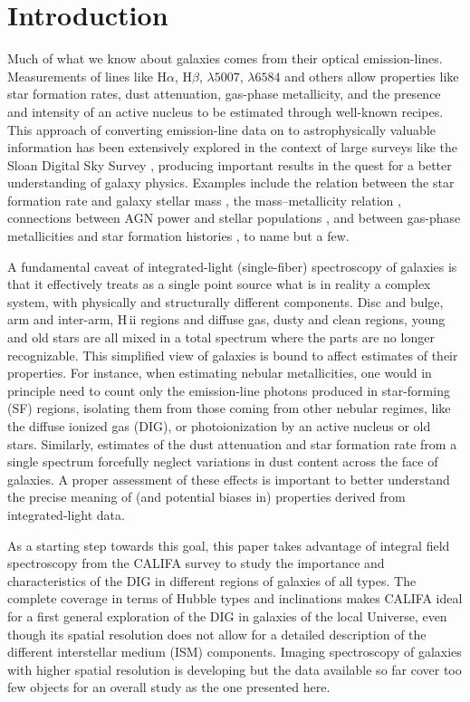 \documentclass[a4paper, fleqn, usenatbib, useAMS]{mnras}
\newcommand{\Ha}{\ifmmode {\rm H}\alpha \else H$\alpha$\fi\xspace}
\newcommand{\Hb}{\ifmmode {\rm H}\beta \else H$\beta$\fi\xspace}
\newcommand{\hii}{H\,{\sc ii}\xspace}
\newcommand{\nii}{\ifmmode [\rm{N}\,\textsc{ii}] \else [N\,{\sc ii}]\fi\xspace}
\newcommand{\oiii}{\ifmmode [\rm{O}\,\textsc{iii}] \else [O\,{\sc iii}]\fi\xspace}
\begin{document}
\section{Introduction}
\label{sec:Intro}

Much of what we know about galaxies comes from their optical emission-lines. Measurements of lines like \Ha, \Hb, \oiii$\lambda5007$, \nii$\lambda6584$ and others allow properties like star formation rates, dust attenuation, gas-phase metallicity, and the presence and intensity of an active nucleus to be estimated through well-known recipes. This approach of converting emission-line data on to astrophysically valuable information has been extensively explored in the context of large surveys like the Sloan Digital Sky Survey \citep{York.etal.2000a}, producing important results in the quest for a better understanding of galaxy physics. Examples include the relation between the star formation rate and galaxy stellar mass \citep{Brinchmann.etal.2004a}, the mass--metallicity relation \citep{Tremonti.etal.2004a}, connections between AGN power and stellar populations \citep{Kauffmann.etal.2003a}, and between gas-phase metallicities and star formation histories \citep{CidFernandes.etal.2007}, to name but a few.

A fundamental caveat of integrated-light (single-fiber) spectroscopy of galaxies is that it effectively treats as a single point source what is in reality a complex system, with  physically and structurally different components. Disc and bulge, arm and inter-arm, \hii regions and diffuse gas,  dusty and clean regions, young and old stars are all mixed in a total spectrum where the parts are no longer recognizable. This simplified view of galaxies is bound to affect estimates of their properties. For instance, when estimating nebular metallicities, one would in principle need to count only the emission-line photons produced in star-forming (SF) regions, isolating them from those coming from other nebular regimes, like the diffuse ionized gas (DIG), or photoionization by an active nucleus or old stars. Similarly, estimates of the dust attenuation and star formation rate from a single spectrum forcefully neglect variations in dust content across the face of galaxies. A proper assessment of these effects is important to better understand the precise meaning of (and potential biases in) properties derived from integrated-light data.

As a starting step towards this goal, this paper takes advantage of integral field spectroscopy from the CALIFA survey \citep{SFSanchez.DR3.2016} to study the importance and characteristics of the DIG in different regions of galaxies of all types. The complete coverage in terms of Hubble types and inclinations makes CALIFA ideal for a first general exploration of the DIG in galaxies of the local Universe, even though its spatial resolution does not allow for a detailed description of the different interstellar medium (ISM) components.  Imaging spectroscopy of galaxies with higher spatial resolution is developing \citep[e.g.,][]{Sanchez.etal.2015MUSE, Vogt.etal.2017a, RousseauNepton.etal.2017} but the data available so far cover  too few objects for an overall study as the one presented here.
\end{document}
